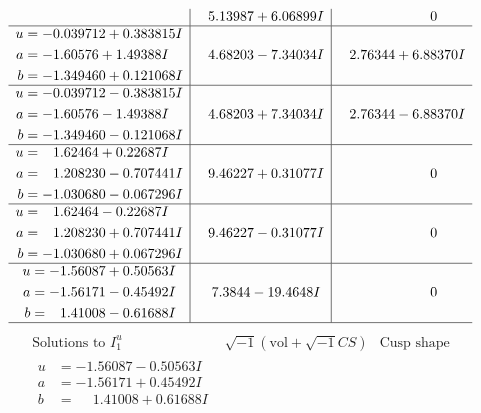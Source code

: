 \documentclass[1p]{elsarticle_modified}
\theoremstyle{definition}
\newcommand{\I}{\sqrt{-1}}
\begin{document}
$$\begin{array}{c|c|c}
 & \phantom{-}5.13987 + 6.06899 I & \phantom{-0.000000 } 0 \\ \hline\begin{aligned}
u &= -0.039712 + 0.383815 I \\
a &= -1.60576 + 1.49388 I \\
b &= -1.349460 + 0.121068 I\end{aligned}
 & \phantom{-}4.68203 - 7.34034 I & \phantom{-}2.76344 + 6.88370 I \\ \hline\begin{aligned}
u &= -0.039712 - 0.383815 I \\
a &= -1.60576 - 1.49388 I \\
b &= -1.349460 - 0.121068 I\end{aligned}
 & \phantom{-}4.68203 + 7.34034 I & \phantom{-}2.76344 - 6.88370 I \\ \hline\begin{aligned}
u &= \phantom{-}1.62464 + 0.22687 I \\
a &= \phantom{-}1.208230 - 0.707441 I \\
b &= -1.030680 - 0.067296 I\end{aligned}
 & \phantom{-}9.46227 + 0.31077 I & \phantom{-0.000000 } 0 \\ \hline\begin{aligned}
u &= \phantom{-}1.62464 - 0.22687 I \\
a &= \phantom{-}1.208230 + 0.707441 I \\
b &= -1.030680 + 0.067296 I\end{aligned}
 & \phantom{-}9.46227 - 0.31077 I & \phantom{-0.000000 } 0 \\ \hline\begin{aligned}
u &= -1.56087 + 0.50563 I \\
a &= -1.56171 - 0.45492 I \\
b &= \phantom{-}1.41008 - 0.61688 I\end{aligned}
 & \phantom{-}7.3844 - 19.4648 I & \phantom{-0.000000 } 0\\
 \hline 
 \end{array}$$\newpage$$\begin{array}{c|c|c}  
\text{Solutions to }I^u_{1}& \I (\text{vol} + \sqrt{-1}CS) & \text{Cusp shape}\\
 \hline 
\begin{aligned}
u &= -1.56087 - 0.50563 I \\
a &= -1.56171 + 0.45492 I \\
b &= \phantom{-}1.41008 + 0.61688 I\end{aligned}

\end{array}$$
\end{document}
